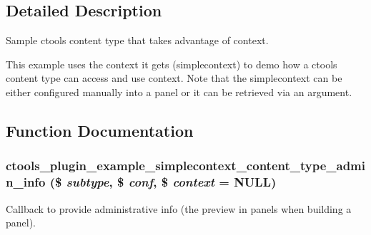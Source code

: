 \subsection{Detailed Description}
Sample ctools content type that takes advantage of context.

This example uses the context it gets (simplecontext) to demo how a ctools content type can access and use context. Note that the simplecontext can be either configured manually into a panel or it can be retrieved via an argument. 

\subsection{Function Documentation}
\hypertarget{simplecontext__content__type_8inc_a5c85e5b51f147db14ef542701b200e73}{
\subsubsection[{ctools\_\-plugin\_\-example\_\-simplecontext\_\-content\_\-type\_\-admin\_\-info}]{\setlength{\rightskip}{0pt plus 5cm}ctools\_\-plugin\_\-example\_\-simplecontext\_\-content\_\-type\_\-admin\_\-info (\$ {\em subtype}, \/  \$ {\em conf}, \/  \$ {\em context} = {\ttfamily NULL})}}
\label{simplecontext__content__type_8inc_a5c85e5b51f147db14ef542701b200e73}
Callback to provide administrative info (the preview in panels when building a panel).

